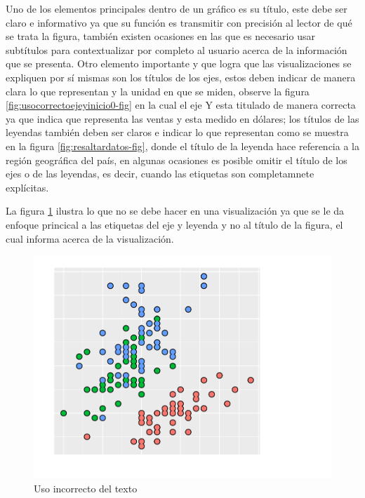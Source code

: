 \documentclass[
]{book}
\begin{document}
Uno de los elementos principales dentro de un gráfico es su título, este debe ser claro e informativo ya que su función es transmitir con precisión al lector de qué se trata la figura, también existen ocasiones en las que es necesario usar subtítulos para contextualizar por completo al usuario acerca de la información que se presenta. Otro elemento importante y que logra que las visualizaciones se expliquen por sí mismas son los títulos de los ejes, estos deben indicar de manera clara lo que representan y la unidad en que se miden, observe la figura \ref{fig:usocorrectoejeyinicio0-fig} en la cual el eje Y esta titulado de manera correcta ya que indica que representa las ventas y esta medido en dólares; los títulos de las leyendas también deben ser claros e indicar lo que representan como se muestra en la figura \ref{fig:resaltardatos-fig}, donde el título de la leyenda hace referencia a la región geográfica del país, en algunas ocasiones es posible omitir el título de los ejes o de las leyendas, es decir, cuando las etiquetas son completamnete explícitas.

La figura \ref{fig:usoincorrectotextos-fig} ilustra lo que no se debe hacer en una visualización ya que se le da enfoque princical a las etiquetas del eje y leyenda y no al título de la figura, el cual informa acerca de la visualización.

\begin{figure}

{\centering \includegraphics[width=0.8\linewidth]{Lineamientos-Visualizar_files/figure-latex/usoincorrectotextos-fig-1} 

}

\caption{Uso incorrecto del texto}\label{fig:usoincorrectotextos-fig}
\end{figure}
\end{document}
